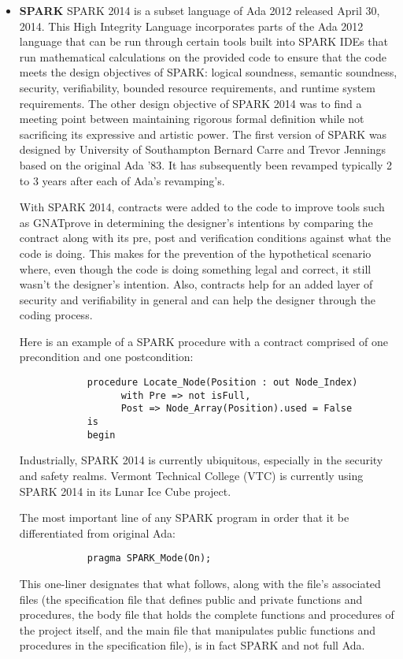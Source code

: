 \begin{itemize}
\item \textbf{SPARK} SPARK 2014 is a subset language of Ada 2012 released April 30, 2014. This
High Integrity Language incorporates parts of the Ada 2012 language that can be run through
certain tools built into SPARK IDEs that run mathematical calculations on the provided code to
ensure that the code meets the design objectives of SPARK: logical soundness, semantic
soundness, security, verifiability, bounded resource requirements, and runtime system
requirements. The other design objective of SPARK 2014 was to find a meeting point between
maintaining rigorous formal definition while not sacrificing its expressive and artistic power.
The first version of SPARK was designed by University of Southampton Bernard Carre and Trevor
Jennings based on the original Ada ’83. It has subsequently been revamped typically 2 to 3 years
after each of Ada’s revamping’s.

With SPARK 2014, contracts were added to the code to improve tools such as GNATprove in
determining the designer’s intentions by comparing the contract along with its pre, post and
verification conditions against what the code is doing. This makes for the prevention of the
hypothetical scenario where, even though the code is doing something legal and correct, it still
wasn’t the designer’s intention. Also, contracts help for an added layer of security and
verifiability in general and can help the designer through the coding process.

Here is an example of a SPARK procedure with a contract comprised of one precondition and one
postcondition:
\begin{verbatim}
			procedure Locate_Node(Position : out Node_Index)
    		   	  with Pre => not isFull,
    		   	  Post => Node_Array(Position).used = False
   		 	is
   		 	begin
\end{verbatim}
  
Industrially, SPARK 2014 is currently ubiquitous, especially in the security and safety realms.
Vermont Technical College (VTC) is currently using SPARK 2014 in its Lunar Ice Cube project.

The most important line of any SPARK program in order that it be differentiated from original
Ada:
\begin{verbatim}
			pragma SPARK_Mode(On);
\end{verbatim}			

This one-liner designates that what follows, along with the file’s associated files (the
specification file that defines public and private functions and procedures, the body file that
holds the complete functions and procedures of the project itself, and the main file that
manipulates public functions and procedures in the specification file), is in fact SPARK and not
full Ada.


\end{itemize}
